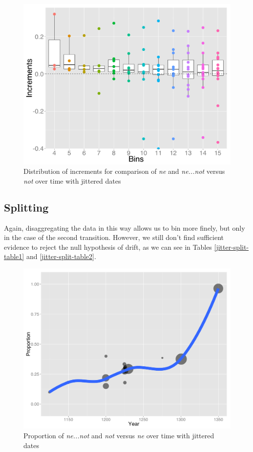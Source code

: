 \begin{figure}
\centering
     \includegraphics[width=\textwidth]{jitter-lump-second-increments.pdf}
\caption{Distribution of increments for  comparison of \textit{\color{red}  ne} and \textit{\color{blue} ne...not} versus  \textit{\color{green} not} over time with jittered dates}
\label{jitter-lump-second-increments}
\end{figure}


\subsection{Splitting}

Again, disaggregating the data in this way allows us to bin more finely, but only in the case of the second transition. However, we still don't find sufficient evidence to reject the null hypothesis of drift, as we can see in Tables \ref{jitter-split-table1} and \ref{jitter-split-table2}.

 
 
\begin{figure}
\centering
     \includegraphics[width=\textwidth]{jitter-split-plot1.pdf}
\caption{Proportion of \textit{\color{blue} ne...not} and \textit{\color{green} not}  versus  \textit{\color{red}  ne} over time with jittered dates}
\label{jitter-split-plot1}
\end{figure}

